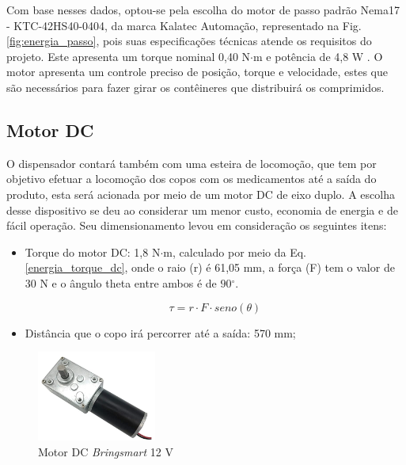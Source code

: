  Com base nesses dados, optou-se pela escolha do motor de passo padrão Nema17 - KTC-42HS40-0404, da marca Kalatec Automação, representado na Fig. \ref{fig:energia_passo}, pois suas especificações técnicas atende os requisitos do projeto. Este apresenta um torque nominal 0,40 N$\cdot$m e potência de 4,8 W . O motor apresenta um controle preciso de posição, torque e velocidade, estes que são necessários para fazer girar os contêineres que distribuirá os comprimidos.
 
 
 \subsection{Motor DC}\label{energ:motor_dc}

O dispensador contará também com uma esteira de locomoção, que tem por objetivo efetuar a locomoção dos copos com os medicamentos até a saída do produto, esta será acionada por meio de um motor DC de eixo duplo. A escolha desse dispositivo se deu ao considerar um menor custo, economia de energia e de fácil operação. Seu dimensionamento levou em consideração os seguintes itens:

\begin{itemize}
    \item Torque do motor DC: 1,8 N$\cdot$m, calculado por meio da Eq. \ref{energia_torque_dc}, onde o raio (r) é 61,05 mm, a força (F) tem o valor de 30 N e o ângulo theta entre ambos é de $90${$^\circ$}.

    \begin{equation}
        \tau = r \cdot F \cdot seno(\theta)
        \label{energia_torque_dc}
    \end{equation}
    
    
    \item Distância que o copo irá percorrer até a saída: 570 mm;
\end{itemize}

\begin{figure}[H]
\centering
    \includegraphics[width=0.35\textwidth]{figuras/energia/fotos_componentes/Energia_dc.png}
    \caption{Motor DC \emph{Bringsmart} 12 V}
    \label{fig:energia_dc}
\end{figure}



